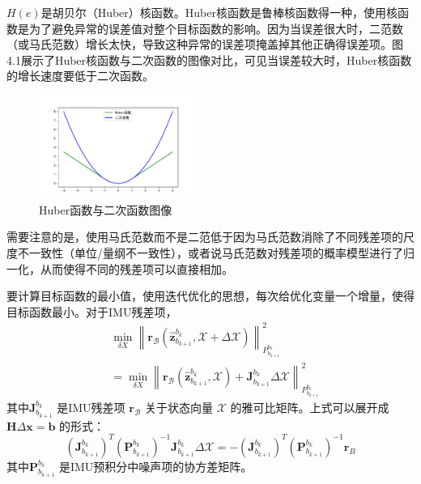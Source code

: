  $H(e) $是胡贝尔（Huber）核函数。Huber核函数是鲁棒核函数得一种，使用核函数是为了避免异常的误差值对整个目标函数的影响。因为当误差很大时，二范数（或马氏范数）增长太快，导致这种异常的误差项掩盖掉其他正确得误差项。图4.1展示了Huber核函数与二次函数的图像对比，可见当误差较大时，Huber核函数的增长速度要低于二次函数。
 \begin{figure}[h]\setlength{\belowcaptionskip}{-12pt}
 	\centering
 	\includegraphics[width=0.45\textwidth]{figures/chapter4/fig4_1}
 	\caption{Huber函数与二次函数图像}\label{fig4_1}
 \end{figure}


需要注意的是，使用马氏范数而不是二范低于因为马氏范数消除了不同残差项的尺度不一致性（单位/量纲不一致性），或者说马氏范数对残差项的概率模型进行了归一化，从而使得不同的残差项可以直接相加。

要计算目标函数的最小值，使用迭代优化的思想，每次给优化变量一个增量，使得目标函数最小。对于IMU残差项，
\begin{equation}
\label{eqn:4.6}
\begin{aligned}
& \min _{\delta X}\left\| \mathbf{r}_\mathcal{B}(\hat{\mathbf{z}}_{b_{k+1}}^{b_k}, \mathcal{X} + \Delta \mathcal{X} )  \right\|_{P_{b_{k+1}}^{b_k}}^{2} \\
&=
\min _{\delta X} 
\left\| 
\mathbf{r}_\mathcal{B}(\hat{\mathbf{z}}_{b_{k+1}}^{b_k},\mathcal{X}) 
+ \mathbf{J}_{b_{k+1}}^{b_k} \Delta \mathcal{X}  \right\| _{P_{b_{k+1}}^{b_k}}^{2}
\end{aligned}
\end{equation}
其中$\mathbf{J}_{b_{k+1}}^{b_k}  $ 是IMU残差项 $\mathbf{r}_{\mathcal{B}} $ 关于状态向量 $\mathcal{X} $ 的雅可比矩阵。上式可以展开成 $\mathbf{H}\Delta \mathbf{x}=\mathbf{b} $ 的形式：
\[
(\mathbf{J} _{b_{k+1}}^{b_{k}})^{T} (\mathbf{P}_{b_{k+1}}^{b_{k}})^{-1} \mathbf{J}_{b_{k+1}}^{b_{k}} \Delta \mathcal{X}
=- (\mathbf{J}_{b_{k+1}}^{b_{k}})^{T} (\mathbf{P}_{b_{k+1}}^{b_{k}})^{-1} \mathbf{r}_{B}
\]
其中$\mathbf{P}_{b_{k+1}}^{b_k} $ 是IMU预积分中噪声项的协方差矩阵。

